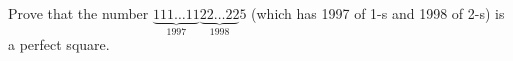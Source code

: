 Prove that the number $\underbrace{111\ldots 11}_{1997}\underbrace{22\ldots 22}_{1998}5$ (which has 1997 of 1-s and 1998 of 2-s) is a perfect square.
